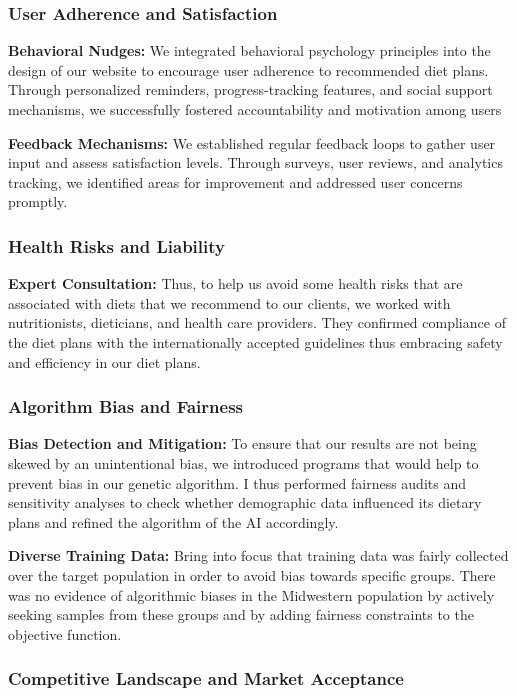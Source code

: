 \documentclass[a4paper,12pt]{article}
\begin{document}
\subsubsection{User Adherence and Satisfaction}

\textbf{Behavioral Nudges:} We integrated behavioral psychology principles into the design of our website to encourage user adherence to recommended diet plans. Through personalized reminders, progress-tracking features, and social support mechanisms, we successfully fostered accountability and motivation among users

\noindent\textbf{Feedback Mechanisms:} We established regular feedback loops to gather user input and assess satisfaction levels. Through surveys, user reviews, and analytics tracking, we identified areas for improvement and addressed user concerns promptly.
\subsubsection{Health Risks and Liability}

\textbf{Expert Consultation:} Thus, to help us avoid some health risks that are associated with diets that we recommend to our clients, we worked with nutritionists, dieticians, and health care providers. They confirmed compliance of the diet plans with the internationally accepted guidelines thus embracing safety and efficiency in our diet plans.
\subsubsection{Algorithm Bias and Fairness}

\textbf{Bias Detection and Mitigation:} To ensure that our results are not being skewed by an unintentional bias, we introduced programs that would help to prevent bias in our genetic algorithm. I thus performed fairness audits and sensitivity analyses to check whether demographic data influenced its dietary plans and refined the algorithm of the AI accordingly.

\noindent\textbf{Diverse Training Data:} Bring into focus that training data was fairly collected over the target population in order to avoid bias towards specific groups. There was no evidence of algorithmic biases in the Midwestern population by actively seeking samples from these groups and by adding fairness constraints to the objective function.
\subsubsection{Competitive Landscape and Market Acceptance}
\end{document}
